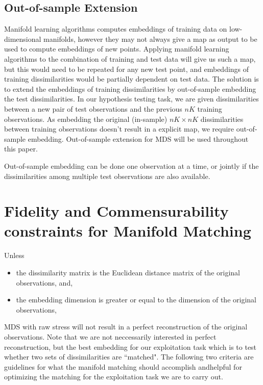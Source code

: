 \documentclass[11pt]{article} %
\begin{document}
\subsection{Out-of-sample Extension}
Manifold learning algorithms computes embeddings of training data on low-dimensional manifolds, however they may not always give a map as output  to  be used to compute embeddings of new points. Applying manifold learning algorithms to the combination  of training and test data  will give us such a map, but this would need to be repeated for any new test point, and embeddings of training dissimilarities would be  partially dependent on test data. The solution is to extend the embeddings of training dissimilarities by out-of-sample embedding the test dissimilarities. 
In our hypothesis testing task, we are given dissimilarities   between a new pair of test observations and the previous $nK$ training observations. As embedding the original (in-sample) $nK \times nK$ dissimilarities between training observations doesn't result in a explicit map, we require out-of-sample embedding.  Out-of-sample extension for MDS will be used throughout this paper\cite{TrossetOOS}. 

Out-of-sample embedding can be done one observation at a time, or jointly if the dissimilarities among multiple test observations are also available. 


\section{Fidelity and Commensurability constraints for Manifold Matching \label{sec:FidComm}}
Unless 
\begin{itemize}
\item the dissimilarity matrix is the Euclidean distance matrix of the original observations, and, 
\item the embedding dimension is greater or equal to the dimension of the original observations,
\end{itemize}
MDS with raw stress will not result in a perfect reconstruction  of the original observations. Note that we are not neccessarily interested in perfect reconstruction, but the best embedding for our exploitation task which is to test whether two sets of dissimilarities are ``matched". The following two criteria  are guidelines for what the manifold matching should accomplish andhelpful for optimizing the matching for the exploitation task we are to carry out.
\end{document}
